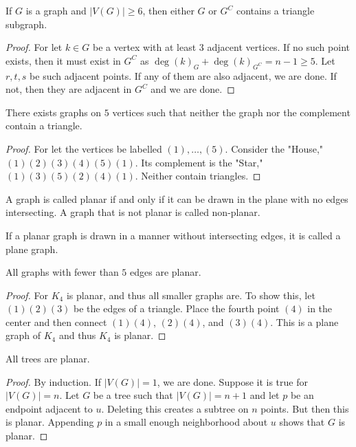 \documentclass[crop=false,class=book,oneside]{standalone}
\begin{document}
\begin{corollary}
If $G$ is a graph and $|V(G)|\geq 6$, then either $G$ or $G^C$ contains a triangle subgraph.
\end{corollary}
\begin{proof}
For let $k\in G$ be a vertex with at least $3$ adjacent vertices. If no such point exists, then it must exist in $G^C$ as $\deg(k)_G+\deg(k)_{G^C} = n-1 \geq 5$. Let $r,t,s$ be such adjacent points. If any of them are also adjacent, we are done. If not, then they are adjacent in $G^C$ and we are done.
\end{proof}
\begin{theorem}
There exists graphs on $5$ vertices such that neither the graph nor the complement contain a triangle.
\end{theorem}
\begin{proof}
For let the vertices be labelled $(1),\hdots,(5)$. Consider the "House," $(1)(2)(3)(4)(5)(1)$. Its complement is the "Star," $(1)(3)(5)(2)(4)(1)$. Neither contain triangles.
\end{proof}
\begin{definition}
A graph is called planar if and only if it can be drawn in the plane with no edges intersecting. A graph that is not planar is called non-planar.
\end{definition}
\begin{definition}
If a planar graph is drawn in a manner without intersecting edges, it is called a plane graph.
\end{definition}
\begin{corollary}
All graphs with fewer than $5$ edges are planar.
\end{corollary}
\begin{proof}
For $K_4$ is planar, and thus all smaller graphs are. To show this, let $(1)(2)(3)$ be the edges of a triangle. Place the fourth point $(4)$ in the center and then connect $(1)(4)$, $(2)(4)$, and $(3)(4)$. This is a plane graph of $K_4$ and thus $K_4$ is planar.
\end{proof}
\begin{theorem}
All trees are planar.
\end{theorem}
\begin{proof}
By induction. If $|V(G)| = 1$, we are done. Suppose it is true for $|V(G)| = n$. Let $G$ be a tree such that $|V(G)| = n+1$ and let $p$ be an endpoint adjacent to $u$. Deleting this creates a subtree on $n$ points. But then this is planar. Appending $p$ in a small enough neighborhood about $u$ shows that $G$ is planar.
\end{proof}
\end{document}
